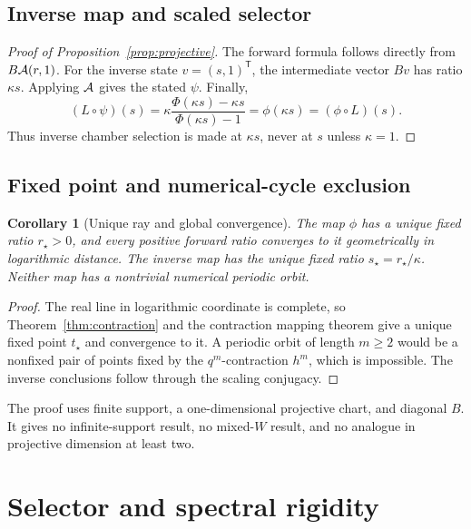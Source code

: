 \documentclass[11pt]{article}
\newtheorem{corollary}[theorem]{Corollary}
\theoremstyle{definition}
\theoremstyle{remark}
\begin{document}
\subsection{Inverse map and scaled selector}

\begin{proof}[Proof of Proposition~\ref{prop:projective}]
The forward formula follows directly from \(B\mathcal{A}(r,1)\).  For the
inverse state \(v=(s,1)^{\mathsf T}\), the intermediate vector \(Bv\)
has ratio \(\kappa s\).  Applying \(\mathcal{A}\) gives the stated \(\psi\).
Finally,
\[
(L\circ\psi)(s)
=\kappa\frac{\Phi(\kappa s)-\kappa s}{\Phi(\kappa s)-1}
=\phi(\kappa s)
=(\phi\circ L)(s).
\]
Thus inverse chamber selection is made at \(\kappa s\), never at \(s\)
unless \(\kappa=1\).
\end{proof}

\subsection{Fixed point and numerical-cycle exclusion}

\begin{corollary}[Unique ray and global convergence]\label{cor:fixed}
The map \(\phi\) has a unique fixed ratio \(r_\star>0\), and every
positive forward ratio converges to it geometrically in logarithmic
distance.  The inverse map has the unique fixed ratio
\(s_\star=r_\star/\kappa\).  Neither map has a nontrivial numerical
periodic orbit.
\end{corollary}

\begin{proof}
The real line in logarithmic coordinate is complete, so
Theorem~\ref{thm:contraction} and the contraction mapping theorem give a
unique fixed point \(t_\star\) and convergence to it.  A periodic orbit of
length \(m\geq2\) would be a nonfixed pair of points fixed by the
\(q^m\)-contraction \(h^m\), which is impossible.  The inverse conclusions
follow through the scaling conjugacy.
\end{proof}

The proof uses finite support, a one-dimensional projective chart, and
diagonal \(B\).  It gives no infinite-support result, no mixed-\(W\)
result, and no analogue in projective dimension at least two.

\section{Selector and spectral rigidity}
\end{document}
